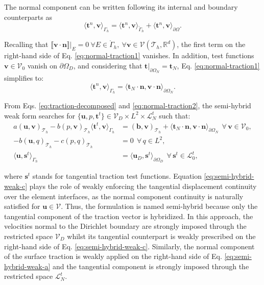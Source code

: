 \documentclass[english,11pt,3p,number,sort&compress]{elsarticle}
\newcommand{\jump}[1]
{
	\llbracket #1 \rrbracket
}
\begin{document}
\noindent The normal component can be written following its internal and boundary counterparts as
\begin{equation} \label{eq:normal-traction1}
	\langle\bm{t}^n,\bm{v}\rangle_{\Gamma_h} = \langle\bm{t}^n,\bm{v}\rangle_{\mathring{\Gamma}_h} + \langle\bm{t}^n,\bm{v}\rangle_{\partial\Omega} .
\end{equation}

\noindent Recalling that $\jump{\bm{v\cdot\bm{n}}}\lvert_E=0 ~\forall E \in \mathring{\Gamma}_h, ~\forall \bm{v}\in \mathcal{V}(\mathcal{T}_h,\mathbb{R}^d)$, the first term on the right-hand side of Eq. \eqref{eq:normal-traction1} vanishes. In addition, test functions $\bm{v} \in \mathcal{V}_0$ vanish on $\partial\Omega_D$, and considering that $\bm{t}\lvert_{\partial\Omega_N}=\bm{t}_N$, Eq. \eqref{eq:normal-traction1} simplifies to:
\begin{equation} \label{eq:normal-traction2}
	\langle\bm{t}^n,\bm{v}\rangle_{\Gamma_h} = \langle\bm{t}_N\cdot\bm{n},\bm{v}\cdot\bm{n}\rangle_{\partial\Omega_N} .
\end{equation}

From Eqs. \eqref{eq:traction-decomposed} and \eqref{eq:normal-traction2}, the semi-hybrid weak form searches for $\{\bm{u},p,\bm{t}^t\} \in \mathcal{V}_D \times L^2 \times \mathcal{L}^t_N$ such that:
\begin{subequations} \label{eq:semi-hybrid-weak}
	\begin{align}
		a\left(\bm{u},\bm{v}\right)_{\mathcal{T}_h} - b\left( p, \bm{v}\right)_{\mathcal{T}_h} \langle\bm{t}^t,\bm{v}\rangle_{\Gamma_h} &= \left(\bm{b},\bm{v}\right)_{\mathcal{T}_h} + \langle\bm{t}_N\cdot\bm{n},\bm{v}\cdot\bm{n}\rangle_{\partial\Omega_N} ~~\forall\, \bm{v} \in \mathcal{V}_0,\label{eq:semi-hybrid-weak-a}\\ 
		-b\left(\bm{u}, q\right)_{\mathcal{T}_h} - c\left(p,q \right)_{\mathcal{T}_h} &= 0 ~~\forall\, q \in L^2, \label{eq:semi-hybrid-weak-b}\\
		\langle\bm{u},\bm{s}^t\rangle_{\Gamma_h} &= \langle\bm{u}_D,\bm{s}^t\rangle_{\partial\Omega_D} ~~\forall\, \bm{s}^t \in \mathcal{L}^t_0, \label{eq:semi-hybrid-weak-c}
	\end{align}
\end{subequations}

\noindent where $\bm{s}^t$ stands for tangential traction test functions. Equation \eqref{eq:semi-hybrid-weak-c} plays the role of weakly enforcing the tangential displacement continuity over the element interfaces, as the normal component continuity is naturally satisfied for $\bm{u} \in \mathcal{V}$. Thus, the formulation is named semi-hybrid because only the tangential component of the traction vector is hybridized. In this approach, the velocities normal to the Dirichlet boundary are strongly imposed through the restricted space $\mathcal{V}_D$ whilst its tangential counterpart is weakly prescribed on the right-hand side of Eq. \eqref{eq:semi-hybrid-weak-c}. Similarly, the normal component of the surface traction is weakly applied on the right-hand side of Eq. \eqref{eq:semi-hybrid-weak-a} and the tangential component is strongly imposed through the restricted space $\mathcal{L}^t_N$.
\end{document}
